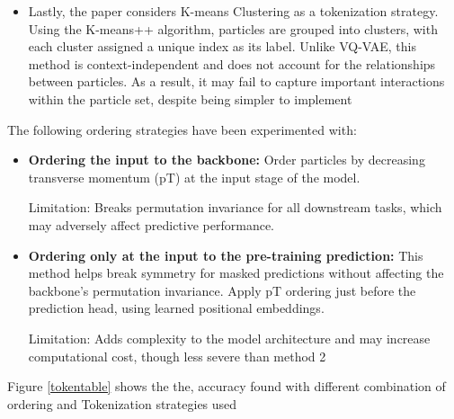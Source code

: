 \documentclass[letterpaper,12pt]{article}
\begin{document}
\begin{spacing}{1.125}
\begin{itemize}
\item Lastly, the paper considers K-means Clustering as a tokenization strategy. Using the K-means++ algorithm, particles are grouped into clusters, with each cluster assigned a unique index as its label. Unlike VQ-VAE, this method is context-independent and does not account for the relationships between particles. As a result, it may fail to capture important interactions within the particle set, despite being simpler to implement
\end{itemize}

The following ordering strategies have been experimented with:
\begin{itemize}
  \item \textbf{Ordering the input to the backbone:} Order particles by decreasing
transverse momentum (pT) at the input stage of the model.

Limitation: Breaks permutation invariance for all downstream tasks, which
may adversely affect predictive performance.
\item \textbf{Ordering only at the input to the pre-training prediction:} This method
helps break symmetry for masked predictions without affecting the
backbone’s permutation invariance.
Apply pT ordering just before the prediction head, using learned positional
embeddings.

Limitation: Adds complexity to the model architecture and may increase
computational cost, though less severe than method 2
\end{itemize}

Figure \ref{tokentable} shows the the, accuracy found with different combination
of ordering and Tokenization strategies used



\end{spacing}
\end{document}
